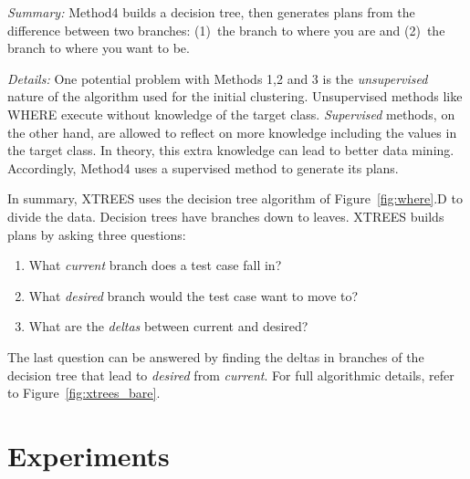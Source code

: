 \documentclass{sig-alternate}
\newcommand{\be}{\begin{enumerate}}
\newcommand{\ee}{\end{enumerate}}
\newcommand{\fig}[1]{Figure~\ref{fig:#1}}
\begin{document}
{\em Summary:} Method4 builds a decision tree,  then generates
plans from the difference between two branches:
(1)~the branch to where you are and (2)~the branch to where you want to be.


{\em Details:} One potential problem with Methods 1,2 and 3 is the {\em unsupervised} nature of
the algorithm used for the initial clustering. Unsupervised methods like WHERE
execute without knowledge of the target class.
{\em Supervised} methods, on the other hand, are allowed to reflect on more knowledge including
the values in the target class. In theory, this extra knowledge can lead to better data mining.
Accordingly, Method4 uses a supervised method to generate its plans.

In summary, XTREES uses the decision tree algorithm of \fig{where}.D to divide the data.
Decision trees have branches down to leaves. 
XTREES builds plans by asking three questions:
\be
\item
What {\em current} branch does a test case fall in?
\item What {\em desired} branch would the test case want to move to?
\item What are the {\em deltas} between current and desired? 
\ee
The last question can be answered by finding the deltas in branches of the decision tree that lead to {\em desired} from {\em current}. For full algorithmic details, refer to \fig{xtrees_bare}.








\section{Experiments}
\end{document}

